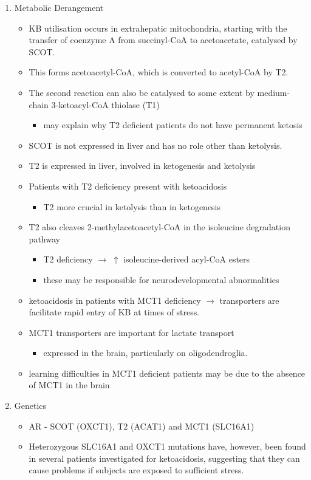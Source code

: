 \documentclass{scrartcl}
\begin{document}
\begin{enumerate}
\item Metabolic Derangement
\label{sec:orgac9c780}
\begin{itemize}
\item KB utilisation occurs in extrahepatic mitochondria, starting with
the transfer of coenzyme A from succinyl-CoA to acetoacetate,
catalysed by SCOT.
\item This forms acetoacetyl-CoA, which is converted to acetyl-CoA by T2.
\item The second reaction can also be catalysed to some extent by
medium-chain 3-ketoacyl-CoA thiolase (T1)
\begin{itemize}
\item may explain why T2 deficient patients do not have permanent
ketosis
\end{itemize}
\item SCOT is not expressed in liver and has no role other than
ketolysis.
\item T2 is expressed in liver, involved in ketogenesis and ketolysis
\item Patients with T2 deficiency present with ketoacidosis
\begin{itemize}
\item T2 more crucial in ketolysis than in ketogenesis
\end{itemize}
\item T2 also cleaves 2-methylacetoacetyl-CoA in the isoleucine
degradation pathway
\begin{itemize}
\item T2 deficiency \(\to\) \(\uparrow\) isoleucine-derived acyl-CoA esters
\item these may be responsible for neurodevelopmental abnormalities
\end{itemize}
\item ketoacidosis in patients with MCT1 deficiency \(\to\) transporters are
facilitate rapid entry of KB at times of stress.
\item MCT1 transporters are important for lactate transport
\begin{itemize}
\item expressed in the brain, particularly on oligodendroglia.
\end{itemize}
\item learning difficulties in MCT1 deficient patients may be due to the
absence of MCT1 in the brain
\end{itemize}

\item Genetics
\label{sec:org179cf95}
\begin{itemize}
\item AR - SCOT (OXCT1), T2 (ACAT1) and MCT1 (SLC16A1)
\item Heterozygous SLC16A1 and OXCT1 mutations have, however, been found
in several patients investigated for ketoacidosis, suggesting that
they can cause problems if subjects are exposed to sufficient stress.


\end{itemize}
\end{enumerate}
\end{document}
